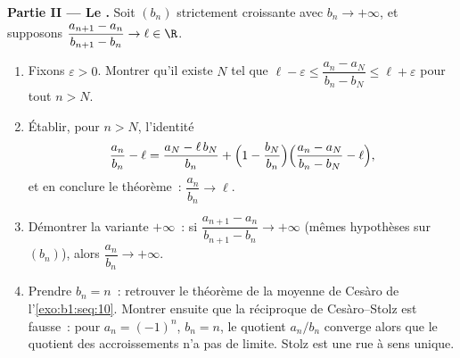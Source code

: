 \begin{problem}[{Devoir maison --- le \omterm{pb:b1:seq:1}{théorème de Cesàro--Stolz}
et l'asymptotique $u_n \sim \sqrt{3/n}$ pour $u_{n+1} = \sin
u_n$}]
\medskip
\noindent\textbf{Partie II --- Le .} Soit
$(b_n)$ strictement croissante avec $b_n \to +\infty$, et supposons
$\dfrac{a_{n+1} - a_n}{b_{n+1} - b_n} \to \ell \in \R$.
\begin{enumerate}[resume]
  \item Fixons $\varepsilon > 0$. Montrer qu'il existe $N$ tel que
        $\ell - \varepsilon \leq \dfrac{a_n - a_N}{b_n - b_N}
        \leq \ell + \varepsilon$ pour tout $n > N$.
  \item Établir, pour $n > N$, l'identité
        \[
        \frac{a_n}{b_n} - \ell
        = \frac{a_N - \ell\,b_N}{b_n}
        + \Bigl(1 - \frac{b_N}{b_n}\Bigr)
        \Bigl(\frac{a_n - a_N}{b_n - b_N} - \ell\Bigr),
        \]
        et en conclure le théorème~: $\dfrac{a_n}{b_n} \to \ell$.
  \item Démontrer la variante $+\infty$~: si $\dfrac{a_{n+1} -
        a_n}{b_{n+1} - b_n} \to +\infty$ (mêmes hypothèses sur
        $(b_n)$), alors $\dfrac{a_n}{b_n} \to +\infty$.
  \item Prendre $b_n = n$~: retrouver le théorème de la moyenne de
        Cesàro de l'\cref{exo:b1:seq:10}. Montrer ensuite que la
        réciproque de Cesàro--Stolz est fausse~: pour $a_n = (-1)^n$,
        $b_n = n$, le quotient $a_n/b_n$ converge alors que le
        quotient des accroissements n'a pas de limite. Stolz est une
        rue à sens unique.
\end{enumerate}


\end{problem}
